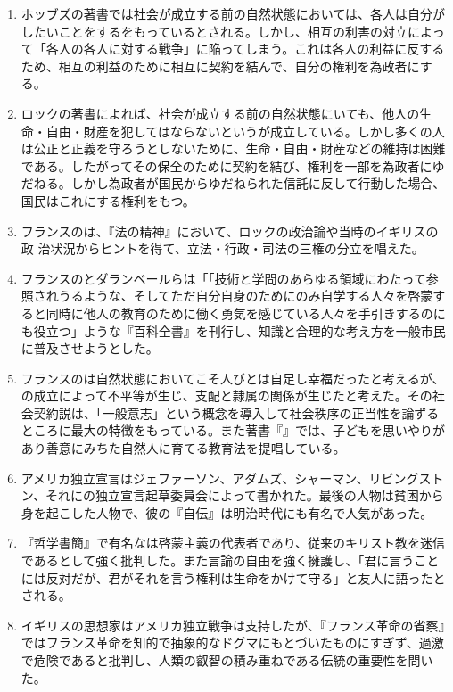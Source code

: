 \documentclass[uplatex,dvipdfmx]{jsarticle}
\begin{document}
\begin{enumerate}
\item ホッブズの著書\anaume{}では社会が成立する前の自然状態においては、各人は自分がしたいことをする{\anaume{}}をもっているとされる。しかし、相互の利害の対立によって「各人の各人に対する戦争」に陥ってしまう。これは各人の利益に反するため、相互の利益のために相互に契約を結んで、自分の権利を為政者に{\anaume{}}する。

  
 \item ロックの著書\anaume{}によれば、社会が成立する前の自然状態にいても、他人の生命・自由・財産を犯してはならないという{\anaume{}}が成立している。しかし多くの人は公正と正義を守ろうとしないために、生命・自由・財産などの維持は困難である。したがってその保全のために契約を結び、権利を一部を為政者にゆだねる。しかし為政者が国民からゆだねられた信託に反して行動した場合、国民はこれに{\anaume{}}する権利をもつ。

 \item フランスの\anaume{}は、『法の精神』において、ロックの政治論や当時のイギリスの政
   治状況からヒントを得て、立法・行政・司法の三権の分立を唱えた。

 \item フランスの\anaume{}とダランベールらは「「技術と学問のあらゆる領域にわたって参照されうるような、そしてただ自分自身のためにのみ自学する人々を啓蒙すると同時に他人の教育のために働く勇気を感じている人々を手引きするのにも役立つ」ような『百科全書』を刊行し、知識と合理的な考え方を一般市民に普及させようとした。

 \item フランスの{\anaume{}}は自然状態においてこそ人びとは自足し幸福だったと考えるが、{\anaume{}}の成立によって不平等が生じ、支配と隷属の関係が生じたと考えた。その社会契約説は、「一般意志」という概念を導入して社会秩序の正当性を論ずるところに最大の特徴をもっている。また著書『\anaume{}』では、子どもを思いやりがあり善意にみちた自然人に育てる教育法を提唱している。


 \item アメリカ独立宣言はジェファーソン、アダムズ、シャーマン、リビングストン、それに\anaume{}の独立宣言起草委員会によって書かれた。最後の人物は貧困から身を起こした人物で、彼の『自伝』は明治時代にも有名で人気があった。

 \item 『哲学書簡』で有名な\anaume{}は啓蒙主義の代表者であり、従来のキリスト教を迷信であるとして強く批判した。また言論の自由を強く擁護し、「君に言うことには反対だが、君がそれを言う権利は生命をかけて守る」と友人に語ったとされる。

 \item イギリスの思想家\anaume{}はアメリカ独立戦争は支持したが、『フランス革命の省察』ではフランス革命を知的で抽象的なドグマにもとづいたものにすぎず、過激で危険であると批判し、人類の叡智の積み重ねである伝統の重要性を問いた。

\end{enumerate}
\end{document}
